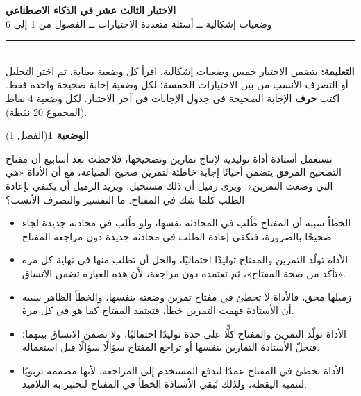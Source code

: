 \documentclass[11pt,a4paper]{article}
\begin{document}
\linespread{1.08}\selectfont
\begin{center}
{\LARGE\khatt\textbf{الاختبار الثالث عشر في الذكاء الاصطناعي}}\\[4pt]
{\normalsize وضعيات إشكالية ــ أسئلة متعددة الاختيارات ــ الفصول من 1 إلى 6}
\end{center}
\vspace{-2pt}\rule{\textwidth}{0.6pt}\\[2pt]
\textbf{التعليمة:} يتضمن الاختبار خمس وضعيات إشكالية. اقرأ كل وضعية بعناية، ثم اختر التحليل أو التصرف الأنسب
من بين الاختيارات الخمسة؛ لكل وضعية إجابة صحيحة واحدة فقط.
اكتب \textbf{حرف} الإجابة الصحيحة في جدول الإجابات في آخر الاختبار.
لكل وضعية 4 نقاط (المجموع 20 نقطة).
\vspace{4pt}

\noindent
{\large\khatt\textbf{الوضعية 1}}\hfill{\small(الفصل 1)}\par\nopagebreak\vspace{3pt}
\setlength{\fboxsep}{7pt}\colorbox{gray!10}{\parbox{\dimexpr\linewidth-14pt}{تستعمل أستاذة أداة توليدية لإنتاج تمارين وتصحيحها، فلاحظت بعد أسابيع أن مفتاح التصحيح المرفق يتضمن أحيانًا إجابة خاطئة لتمرين صحيح الصياغة، مع أن الأداة «هي التي وضعت التمرين». ويرى زميل أن ذلك مستحيل. ويريد الزميل أن يكتفي بإعادة الطلب كلما شك في المفتاح. ما التفسير والتصرف الأنسب؟}}\par\nopagebreak
\begin{itemize}[leftmargin=1.0cm, labelsep=6pt, itemsep=3pt, topsep=4pt, parsep=0pt]
  \item[\textbf{أ)}] الخطأ سببه أن المفتاح طُلب في المحادثة نفسها، ولو طُلب في محادثة جديدة لجاء صحيحًا بالضرورة، فتكفي إعادة الطلب في محادثة جديدة دون مراجعة المفتاح.
  \item[\textbf{ب)}] الأداة تولّد التمرين والمفتاح توليدًا احتماليًا، والحل أن تطلب منها في نهاية كل مرة «تأكد من صحة المفتاح»، ثم تعتمده دون مراجعة، لأن هذه العبارة تضمن الاتساق.
  \item[\textbf{ج)}] زميلها محق، فالأداة لا تخطئ في مفتاح تمرين وضعته بنفسها، والخطأ الظاهر سببه أن الأستاذة فهمت التمرين خطأ، فتعتمد المفتاح كما هو في كل مرة.
  \item[\textbf{د)}] الأداة تولّد التمرين والمفتاح كلًّا على حدة توليدًا احتماليًا، ولا تضمن الاتساق بينهما؛ فتحلّ الأستاذة التمارين بنفسها أو تراجع المفتاح سؤالًا سؤالًا قبل استعماله.
  \item[\textbf{هـ)}] الأداة تخطئ في المفتاح عمدًا لتدفع المستخدم إلى المراجعة، لأنها مصممة تربويًا لتنمية اليقظة، ولذلك تُبقي الأستاذة الخطأ في المفتاح لتختبر به التلاميذ.
\end{itemize}
\end{document}
